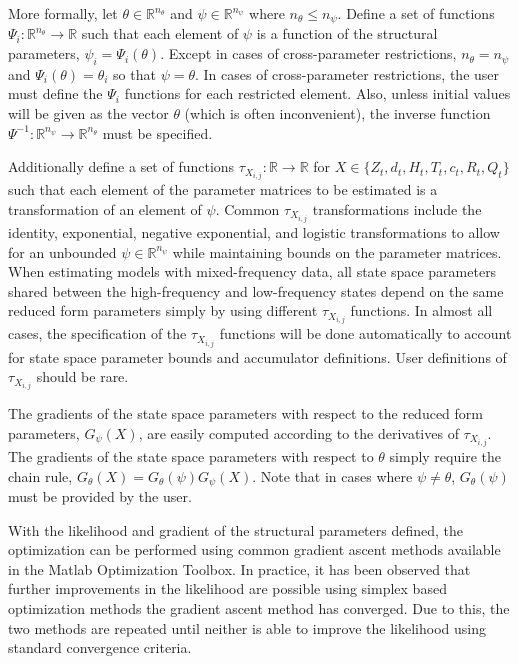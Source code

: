 \documentclass[12pt]{article}
\newcommand{\Gt}{G_\theta}
\begin{document}
	More formally, let $\theta \in \mathbb{R}^{n_\theta}$ and $\psi \in \mathbb{R}^{n_\psi}$ where $n_\theta \leq n_\psi$. Define a set of functions $\Psi_i: \mathbb{R}^{n_\theta} \rightarrow \mathbb{R}$ such that each element of $\psi$ is a function of the structural parameters, $\psi_i = \Psi_i(\theta)$. Except in cases of cross-parameter restrictions, $n_\theta = n_\psi$ and $\Psi_i(\theta) = \theta_i$ so that $\psi = \theta$. In cases of cross-parameter restrictions, the user must define the $\Psi_i$ functions for each restricted element. Also, unless initial values will be given as the vector $\theta$ (which is often inconvenient), the inverse function $\Psi^{-1} : \mathbb{R}^{n_\psi} \rightarrow \mathbb{R}^{n_\theta}$ must be specified.

	Additionally define a set of functions $\tau_{X_{i,j}}: \mathbb{R} \rightarrow \mathbb{R}$ for $X \in \{ Z_t, d_t, H_t, T_t, c_t, R_t, Q_t \}$ such that each element of the parameter matrices to be estimated is a transformation of an element of $\psi$. Common $\tau_{X_{i,j}}$ transformations include the identity, exponential, negative exponential, and logistic transformations to allow for an unbounded $\psi \in \mathbb{R}^{n_\psi}$ while maintaining bounds on the parameter matrices. When estimating models with mixed-frequency data, all state space parameters shared between the high-frequency and low-frequency states depend on the same reduced form parameters simply by using different $\tau_{X_{i,j}}$ functions. In almost all cases, the specification of the $\tau_{X_{i,j}}$ functions will be done automatically to account for state space parameter bounds and accumulator definitions. User definitions of $\tau_{X_{i,j}}$ should be rare. 

	The gradients of the state space parameters with respect to the reduced form parameters, $G_\psi(X)$, are  easily computed according to the derivatives of $\tau_{X_{i,j}}$. The gradients of the state space parameters with respect to $\theta$ simply require the chain rule, $\Gt(X) = \Gt(\psi) G_\psi(X) $. Note that in cases where $\psi \neq \theta$, $\Gt(\psi)$ must be provided by the user.

	With the likelihood and gradient of the structural parameters defined, the optimization can be performed using common gradient ascent methods available in the Matlab Optimization Toolbox. In practice, it has been observed that further improvements in the likelihood are possible using simplex based optimization methods the gradient ascent method has converged. Due to this, the two methods are repeated until neither is able to improve the likelihood using standard convergence criteria. 
\end{document}
